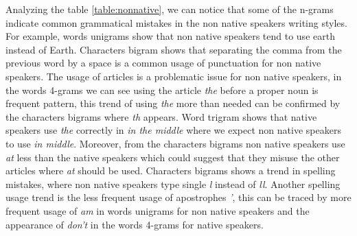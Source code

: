 \documentclass[10pt,a5paper,twoside]{article}
\begin{document}
Analyzing the table \ref{table:nonnative}, we can notice that some of the n-grams
indicate common grammatical mistakes in the non native speakers writing styles.
For example, words unigrams show that non native speakers tend to use earth
instead of Earth. Characters bigram shows that separating the comma from the
previous word by a space is a common usage of punctuation for non native speakers.
The usage of articles is a problematic issue for non native speakers, in the
words 4-grams we can see using the article \emph{the} before a proper noun is
frequent pattern, this trend of using \emph{the} more than needed can be confirmed by the characters bigrams where \emph{th} appears. Word trigram shows that native speakers use \emph{the} correctly in \emph{in the middle} where we expect non native speakers to use \emph{in middle}.
Moreover, from the characters bigrams non native speakers use \emph{at} less
than the native speakers which could suggest that they misuse the other articles
where \emph{at} should be used. Characters bigrams shows a trend in spelling
mistakes, where non native speakers type single \emph{l} instead of \emph{ll}.
Another spelling usage trend is the less frequent usage of apostrophes \emph{'},
this can be traced by more frequent usage of \emph{am} in words unigrams for non native speakers and the appearance of \emph{don't} in the words 4-grams for native speakers.
\end{document}
